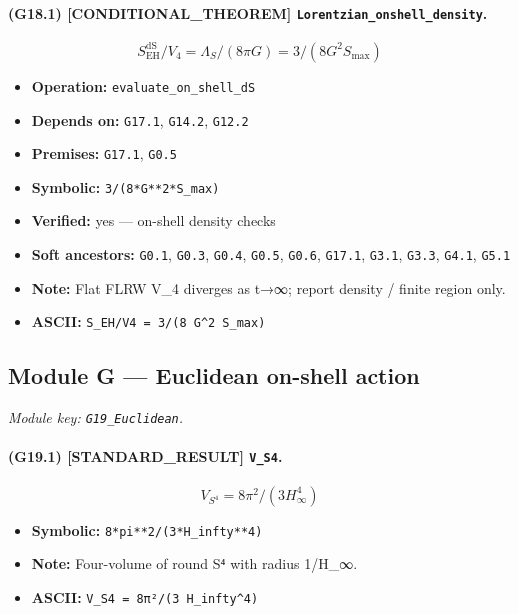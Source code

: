 \documentclass[11pt,a4paper]{article}
\theoremstyle{remark}\newtheorem*{caution}{Caution}
\newcommand{\tagbox}[1]{\textsc{[#1]}}
\begin{document}
\paragraph{(G18.1) \tagbox{CONDITIONAL\_THEOREM} \texttt{Lorentzian\_onshell\_density}.}
\begin{equation}
S_{\mathrm{EH}}^{\mathrm{dS}}/V_4=\Lambda_S/(8\pi G)=3/(8G^2 S_{\max})
\tag{G18.1}
\end{equation}
\begin{itemize}\setlength{\itemsep}{0.12em}
\item \textbf{Operation:} \texttt{evaluate\_on\_shell\_dS}
\item \textbf{Depends on:} \texttt{G17.1}, \texttt{G14.2}, \texttt{G12.2}
\item \textbf{Premises:} \texttt{G17.1}, \texttt{G0.5}
\item \textbf{Symbolic:} \texttt{3/(8*G**2*S\_max)}
\item \textbf{Verified:} yes --- on-shell density checks
\item \textbf{Soft ancestors:} \texttt{G0.1}, \texttt{G0.3}, \texttt{G0.4}, \texttt{G0.5}, \texttt{G0.6}, \texttt{G17.1}, \texttt{G3.1}, \texttt{G3.3}, \texttt{G4.1}, \texttt{G5.1}
\item \textbf{Note:} Flat FLRW V\_4 diverges as t→∞; report density / finite region only.
\item \textbf{ASCII:} \texttt{S\_EH/V4 = 3/(8 G^2 S\_max)}
\end{itemize}
\subsection{Module G --- Euclidean on-shell action}
\textit{Module key: \texttt{G19\_Euclidean}.}
\paragraph{(G19.1) \tagbox{STANDARD\_RESULT} \texttt{V\_S4}.}
\begin{equation}
V_{S^4}=8\pi^2/(3 H_\infty^4)
\tag{G19.1}
\end{equation}
\begin{itemize}\setlength{\itemsep}{0.12em}
\item \textbf{Symbolic:} \texttt{8*pi**2/(3*H\_infty**4)}
\item \textbf{Note:} Four-volume of round S⁴ with radius 1/H\_∞.
\item \textbf{ASCII:} \texttt{V\_S4 = 8π²/(3 H\_infty^4)}
\end{itemize}
\end{document}
